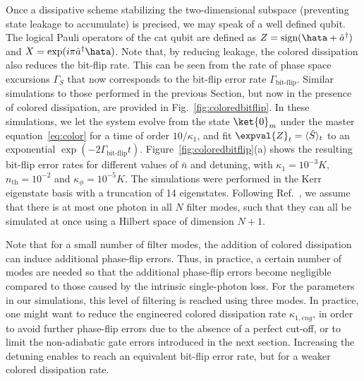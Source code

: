 Once a dissipative scheme stabilizing the two-dimensional subspace (preventing state leakage to accumulate) is precised, we may speak of a well defined qubit. The logical Pauli operators of the cat qubit are defined as $Z=\text{sign}(\hata+\hat{a}^{\dagger})$ and $X=\exp(i\pi\hat{a}^{\dagger}\hata)$. Note that, by reducing leakage, the colored dissipation also reduces the bit-flip rate. This can be seen from the rate of phase space excursions $\Gamma_S$ that now corresponds to the bit-flip error rate $\Gamma_\text{bit-flip}$. Similar simulations to those performed in the previous Section, but now in the presence of colored dissipation, are provided in Fig.~\ref{fig:coloredbitflip}. In these simulations, we let the system evolve from the state $\ket{0}_m$ under the master equation~\eqref{eq:color} for a time of order $10/\kappa_1$, and fit $\expval{Z}_t=\langle \hat S \rangle_t$ to an exponential $\exp(-2\Gamma_{\text{bit-flip}}t)$. Figure~\ref{fig:coloredbitflip}(a) shows the resulting bit-flip error rates for different values of $\bar{n}$ and detuning, with $\kappa_1 = 10^{-3}K$, $n_{\text{th}} = 10^{-2}$ and $\kappa_\phi = 10^{-5}K$. The simulations were performed in the Kerr eigenstate basis with a truncation of 14 eigenstates. Following Ref.~\cite{Putterman2022}, we assume that there is at most one photon in all $N$ filter modes, such that they can all be simulated at once using a Hilbert space of dimension $N+1$.

Note that for a small number of filter modes, the addition of colored dissipation can induce additional phase-flip errors. Thus, in practice, a certain number of modes are needed so that the additional phase-flip errors become negligible compared to those caused by the intrinsic single-photon loss. For the parameters in our simulations, this level of filtering is reached using three modes. In practice, one might want to reduce the engineered colored dissipation rate $\kappa_{1,eng}$, in order to avoid further phase-flip errors due to the absence of a perfect cut-off, or to limit the non-adiabatic gate errors introduced in the next section. Increasing the detuning enables to reach an equivalent bit-flip error rate, but for a weaker colored dissipation rate.

